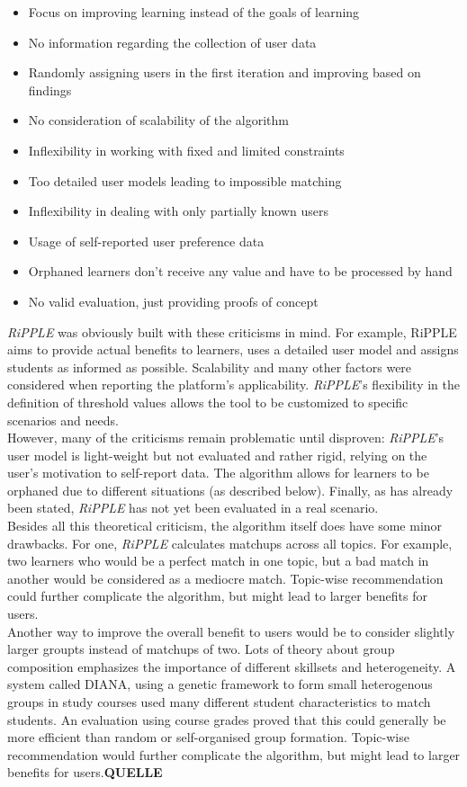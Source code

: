 \documentclass[conference]{IEEEtran}
\begin{document}
\begin{itemize}
	\item Focus on improving learning instead of the goals of learning
	\item No information regarding the collection of user data
	\item Randomly assigning users in the first iteration and improving based on findings
	\item No consideration of scalability of the algorithm
	\item Inflexibility in working with fixed and limited constraints
	\item Too detailed user models leading to impossible matching
	\item Inflexibility in dealing with only partially known users
	\item Usage of self-reported user preference data
	\item Orphaned learners don't receive any value and have to be processed by hand
	\item No valid evaluation, just providing proofs of concept
\end{itemize}
\textit{RiPPLE} was obviously built with these criticisms in mind. For example, RiPPLE aims to provide actual benefits to learners, uses a detailed user model and assigns students as informed as possible. Scalability and many other factors were considered when reporting the platform's applicability. \textit{RiPPLE}'s flexibility in the definition of threshold values allows the tool to be customized to specific scenarios and needs.\\ However, many of the criticisms remain problematic until disproven: \textit{RiPPLE}'s user model is light-weight but not evaluated and rather rigid, relying on the user's motivation to self-report data. The algorithm allows for learners to be orphaned due to different situations (as described below). Finally, as has already been stated, \textit{RiPPLE} has not yet been evaluated in a real scenario.\\
Besides all this theoretical criticism, the algorithm itself does have some minor drawbacks. For one, \textit{RiPPLE} calculates matchups across all topics. For example, two learners who would be a perfect match in one topic, but a bad match in another would be considered as a mediocre match. Topic-wise recommendation could further complicate the algorithm, but might lead to larger benefits for users.\\
Another way to improve the overall benefit to users would be to consider slightly larger groupts instead of matchups of two. Lots of theory about group composition emphasizes the importance of different skillsets and heterogeneity. \cite{olakanmi2017group, blumenfeld1996learning, manske2015using} A system called DIANA, using a genetic framework to form small heterogenous groups in study courses used many different student characteristics to match students. An evaluation using course grades proved that this could generally be more efficient than random or self-organised group formation. Topic-wise recommendation would further complicate the algorithm, but might lead to larger benefits for users.\textbf{QUELLE}\\
\end{document}
